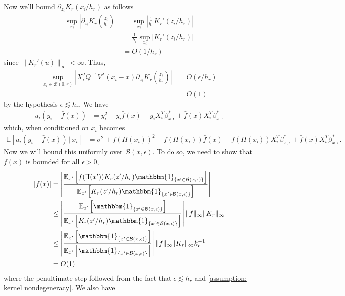 \documentclass[11pt]{article}
\begin{document}
Now we'll bound $\partial_{z_i}K_r(x_i/h_r)$ as follows
\begin{align}
    \sup_{x_i}\left|\partial_{z_i}K_r\left(\frac{z_i}{h_r}\right) \right| &= \sup_{x_i}\left|\frac{1}{h_r}K_r'(z_i/h_r)\right| \\
    &= \frac{1}{h_r}\sup_{x_i}\left|K_r'(z_i/h_r)\right| \\
    &= O(1/h_r) \label{eq: kernel gradient bound}
\end{align}
since $\|K_r'(u)\|_{\infty} < \infty$. Thus,
\begin{align}
    \sup_{x_i \in \mathcal{B}(0, r)}\left|X_i^TQ^{-1}V^T(x_i - x)\partial_{z_i}K_r\left(\frac{z_i}{h_r}\right)\right| &= O(\epsilon/h_r) \\
    &= O(1)
\end{align}
by the hypothesis $\epsilon\lesssim h_r$. We have
\begin{align}
    u_i(y_i - \bar{f}(x)) &= y_i^2 - y_i\bar{f}(x) - y_iX_i^T\beta_{x, \epsilon}^* + \bar{f}(x)X_i^T\beta_{x, \epsilon}^*
\end{align}
which, when conditioned on $x_i$ becomes 
\begin{align}
    \mathbb{E}[u_i(y_i - \bar{f}(x))\,| \,x_i] &= \sigma^2 + f(\Pi(x_i))^2 - f(\Pi(x_i))\bar{f}(x) - f(\Pi(x_i))X_i^T\beta_{x, \epsilon}^* + \bar{f}(x)X_i^T\beta_{x, \epsilon}^*.
\end{align}
Now we will bound this uniformly over $\mathcal{B}(x, \epsilon)$. To do so, we need to show that $\bar{f}(x)$ is bounded for all $\epsilon > 0$,
\begin{align}
    |\bar{f}(x)| &= \left|\frac{\mathbb{E}_{x'}\left[f(\Pi(x'))K_r(z'/h_r)\mathbbm{1}_{\{x'\in \mathcal{B}(x, \epsilon)\}}\right]}{\mathbb{E}_{x'}\left[K_r(z'/h_r)\mathbbm{1}_{\{x'\in \mathcal{B}(x, \epsilon)\}}\right]}\right| \\
    &\leq \left|\frac{\mathbb{E}_{x'}\left[\mathbbm{1}_{\{x'\in \mathcal{B}(x, \epsilon)\}}\right]}{\mathbb{E}_{x'}\left[K_r(z'/h_r)\mathbbm{1}_{\{x'\in \mathcal{B}(x, \epsilon)\}}\right]}\right|\|f\|_{\infty}\|K_r\|_{\infty} \\
    &\leq \left|\frac{\mathbb{E}_{x'}\left[\mathbbm{1}_{\{x'\in \mathcal{B}(x, \epsilon)\}}\right]}{\mathbb{E}_{x'}\left[\mathbbm{1}_{\{x'\in \mathcal{B}(x, \epsilon)\}}\right]}\right|\|f\|_{\infty}\|K_r\|_{\infty}k_r^{-1} \\
    &= O(1)
\end{align}
where the penultimate step followed from the fact that $\epsilon \lesssim h_r$ and \cref{assumption: kernel nondegeneracy}. We also have
\end{document}
